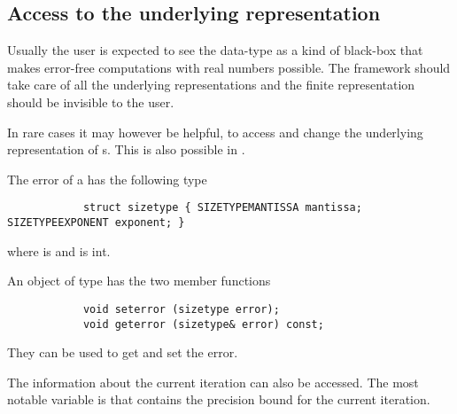 	\subsection{Access to the underlying representation}
		Usually the user is expected to see the data-type \real as a kind of
    black-box that makes error-free computations with real numbers possible.
    The framework should take care of all the underlying representations and
    the finite representation should be invisible to the user.

    In rare cases it may however be helpful, to access and change the
    underlying representation of {\real}s.
    This is also possible in \irram.
     
		The error of a \real has the following type
		\begin{verbatim}
			struct sizetype { SIZETYPEMANTISSA mantissa; SIZETYPEEXPONENT exponent; }
		\end{verbatim}
		where  is  and  is int.
		
		An object of type \real has the two member functions
		\begin{verbatim}
			void seterror (sizetype error);
			void geterror (sizetype& error) const;
		\end{verbatim}
    They can be used to get and set the error.
    
    The information about the current iteration can also be accessed.
    The most notable variable is  that
    contains the precision bound for the current iteration.
